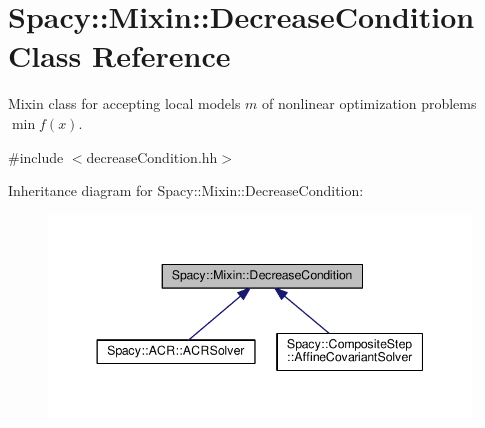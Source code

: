 \hypertarget{classSpacy_1_1Mixin_1_1DecreaseCondition}{}\section{Spacy\+:\+:Mixin\+:\+:Decrease\+Condition Class Reference}
\label{classSpacy_1_1Mixin_1_1DecreaseCondition}


Mixin class for accepting local models $m$ of nonlinear optimization problems $\min f(x)$.  




{\ttfamily \#include $<$decrease\+Condition.\+hh$>$}



Inheritance diagram for Spacy\+:\+:Mixin\+:\+:Decrease\+Condition\+:
\nopagebreak
\begin{figure}[H]
\begin{center}
\leavevmode
\includegraphics[width=344pt]{classSpacy_1_1Mixin_1_1DecreaseCondition__inherit__graph}
\end{center}
\end{figure}
